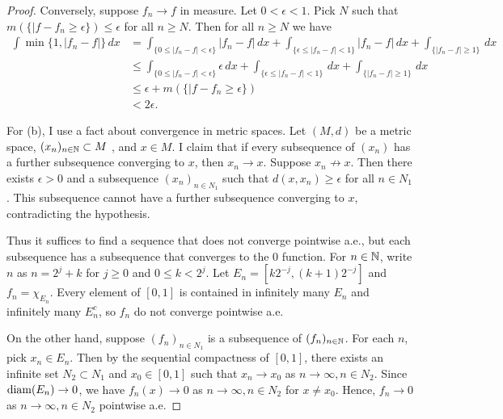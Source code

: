 \documentclass{article}
\begin{document}
\begin{proof}
Conversely, suppose $f_n \to f$ in measure.  Let $0 < \epsilon < 1$. Pick $N$ such that $m( \{ |f - f_n \ge \epsilon \})  \le \epsilon$ for all $n \ge N$.  Then for all $n \ge N$ we have
\begin{align*}
\int \min \{1, |f_n - f|\} \, dx & =  \int_{\{ 0 \le |f_n - f| < \epsilon \}} |f_n - f| \, dx + \int_{\{ \epsilon \le |f_n - f| < 1\}} |f_n - f| \, dx + \int_{\{|f_n - f| \ge 1\}} \, dx
\\ & \le \int_{\{ 0 \le |f_n - f| < \epsilon \}} \epsilon \, dx + \int_{\{ \epsilon \le |f_n - f| < 1\}} \, dx + \int_{\{|f_n - f| \ge 1\}} \, dx
\\ & \le \epsilon + m( \{ |f - f_n \ge \epsilon \})
\\ & < 2 \epsilon.
\end{align*}

For (b), I use a fact about convergence in metric spaces. Let $(M, d)$ be a metric space, $(x_n)_{n \in \mathbb{N}} \subset M$ , and $x \in M$.  I claim that if every subsequence of $(x_n)$ has a further subsequence converging to $x$, then $x_n \to x$.  Suppose $x_n \not \to x$.  Then there exists $\epsilon > 0$ and a subsequence $(x_n)_{n \in N_1}$ such that $d(x, x_n) \ge \epsilon$ for all $n \in N_1$. This subsequence cannot have a further subsequence converging to $x$, contradicting the hypothesis.

Thus it suffices to find a sequence that does not converge pointwise a.e., but each subsequence has a subsequence that converges to the $0$ function.  For $n \in \mathbb{N}$, write $n$ as $n = 2^j + k$ for $j \ge 0$ and $0 \le k < 2^j$.  Let $E_n = [k 2^{-j}, (k+1) 2^{-j}]$ and $f_n = \chi_{E_n}$.  Every element of $[0,1]$ is contained in infinitely many $E_n$ and infinitely many $E_n^c$, so $f_n$ do not converge pointwise a.e.  

On the other hand, suppose $(f_n)_{n \in N_1}$ is a subsequence of $(f_n)_{n \in \mathbb{N}}$.  For each $n$, pick $x_n \in E_n$.  Then by the sequential compactness of $[0,1]$, there exists an infinite set $N_2 \subset N_1$ and $x_0 \in [0,1]$ such that $x_n \to x_0$ as $n \to \infty, n \in N_2$. Since $\mathrm{diam}(E_n) \to 0$, we have $f_n(x) \to 0$ as $n \to \infty, n \in N_2$ for $x \neq x_0$.  Hence, $f_n \to 0$ as $n \to \infty, n \in N_2$ pointwise a.e.
\end{proof}
\end{document}
